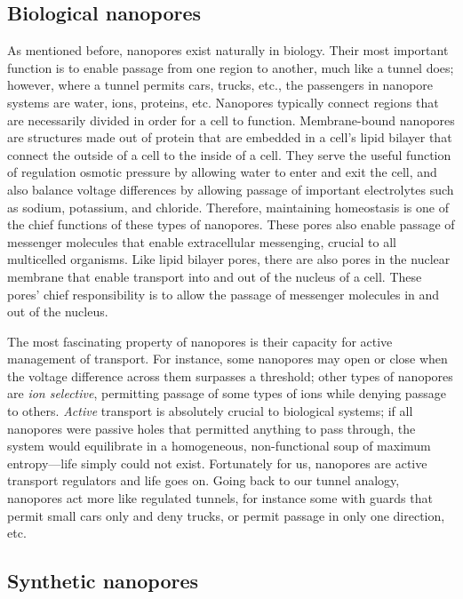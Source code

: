 		\subsection{Biological nanopores}

			As mentioned before, nanopores exist naturally in biology. Their most important function is to enable passage from one region to another, much like a tunnel does; however, where a tunnel permits cars, trucks, etc., the passengers in nanopore systems are water, ions, proteins, etc. Nanopores typically connect regions that are necessarily divided in order for a cell to function. Membrane-bound nanopores are structures made out of protein that are embedded in a cell's lipid bilayer that connect the outside of a cell to the inside of a cell. They serve the useful function of regulation osmotic pressure by allowing water to enter and exit the cell, and also balance voltage differences by allowing passage of important electrolytes such as sodium, potassium, and chloride. Therefore, maintaining homeostasis is one of the chief functions of these types of nanopores. These pores also enable passage of messenger molecules that enable extracellular messenging, crucial to all multicelled organisms. Like lipid bilayer pores, there are also pores in the nuclear membrane that enable transport into and out of the nucleus of a cell. These pores' chief responsibility is to allow the passage of messenger molecules in and out of the nucleus. 

			The most fascinating property of nanopores is their capacity for active management of transport. For instance, some nanopores may open or close when the voltage difference across them surpasses a threshold; other types of nanopores are \textit{ion selective}, permitting passage of some types of ions while denying passage to others. \textit{Active} transport is absolutely crucial to biological systems; if all nanopores were passive holes that permitted anything to pass through, the system would equilibrate in a homogeneous, non-functional soup of maximum entropy---life simply could not exist. Fortunately for us, nanopores are active transport regulators and life goes on. Going back to our tunnel analogy, nanopores act more like regulated tunnels, for instance some with guards that permit small cars only and deny trucks, or permit passage in only one direction, etc.

		\subsection{Synthetic nanopores}

